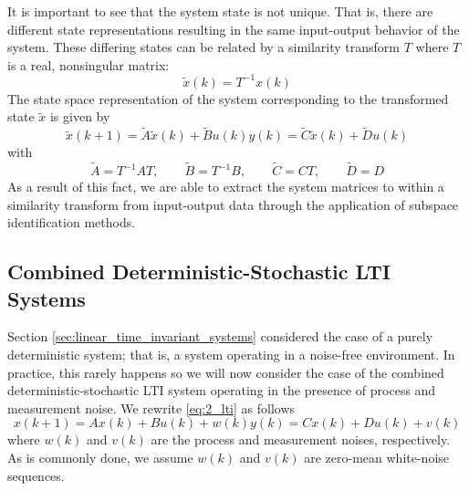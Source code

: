 It is important to see that the system state is not unique. That is, there are different state representations resulting in the same input-output behavior of the system. These differing states can be related by a similarity transform $T$ where $T$ is a real, nonsingular matrix:
\begin{equation*}
\tilde{x}(k) = T^{-1}x(k)
\end{equation*}
The state space representation of the system corresponding to the transformed state $\tilde{x}$ is given by
\begin{subequations}
\begin{equation*}\tilde{x}(k+1) = \tilde{A}\tilde{x}(k) + \tilde{B}u(k)\end{equation*}
\begin{equation*}y(k) = \tilde{C}\tilde{x}(k) + \tilde{D}u(k)\end{equation*}
\end{subequations}
with
\begin{equation*}
\tilde{A} = T^{-1}AT, \qquad
\tilde{B} = T^{-1}B, \qquad
\tilde{C} = CT, \qquad
\tilde{D} = D
\end{equation*}
As a result of this fact, we are able to extract the system matrices to within a similarity transform from input-output data through the application of subspace identification methods.

\subsection{Combined Deterministic-Stochastic LTI Systems}
Section \ref{sec:linear_time_invariant_systems} considered the case of a purely deterministic system; that is, a system operating in a noise-free environment. In practice, this rarely happens so we will now consider the case of the combined deterministic-stochastic LTI system operating in the presence of process and measurement noise. We rewrite \ref{eq:2_lti} as follows
\begin{subequations}\label{eq:2_lti_noise}
\begin{equation}x(k+1) = Ax(k) + Bu(k) + w(k)\end{equation}
\begin{equation}y(k) = Cx(k) + Du(k) + v(k)\end{equation}
\end{subequations}
where $w(k)$ and $v(k)$ are the process and measurement noises, respectively. As is commonly done, we assume $w(k)$ and $v(k)$ are zero-mean white-noise sequences. 

